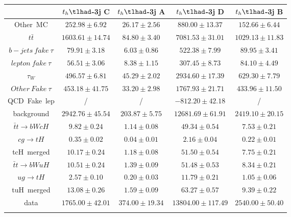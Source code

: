 \begin{tabular}{ccccc} \toprule\toprule
 & $t_{h}\tlhad$-3j C & $t_{h}\tlhad$-3j A & $t_{h}\tlhad$-3j D & $t_{h}\tlhad$-3j B\\\midrule
Other~MC & $252.98\pm6.92$ & $26.17\pm2.56$ & $880.00\pm13.37$ & $152.66\pm6.44$\\
$t\bar{t}$ & $1603.61\pm14.74$ & $84.80\pm3.40$ & $7081.53\pm31.01$ & $1029.13\pm11.83$\\
$b-jets~fake~\tau$ & $79.91\pm3.18$ & $6.03\pm0.86$ & $522.38\pm7.99$ & $89.95\pm3.41$\\
$lepton~fake~\tau$ & $56.51\pm3.06$ & $8.38\pm1.15$ & $307.45\pm8.73$ & $84.10\pm4.49$\\
$\tau_{W}$ & $496.57\pm6.81$ & $45.29\pm2.02$ & $2934.60\pm17.39$ & $629.30\pm7.79$\\
$Other~Fake~\tau$ & $453.18\pm41.75$ & $33.20\pm2.98$ & $1767.93\pm21.71$ & $433.96\pm11.50$\\
QCD~Fake~lep &  / &  / & $-812.20\pm42.18$ &  /\\
background & $2942.76\pm45.54$ & $203.87\pm5.75$ & $12681.69\pm61.91$ & $2419.10\pm20.15$\\\midrule
$\bar{t}t\to bWcH$ & $9.82\pm0.24$ & $1.14\pm0.08$ & $49.34\pm0.54$ & $7.53\pm0.21$\\
$cg\to tH$ & $0.35\pm0.02$ & $0.04\pm0.01$ & $2.16\pm0.04$ & $0.22\pm0.01$\\
tcH~merged & $10.17\pm0.24$ & $1.18\pm0.08$ & $51.50\pm0.54$ & $7.75\pm0.21$\\
$\bar{t}t\to bWuH$ & $10.51\pm0.24$ & $1.39\pm0.09$ & $51.48\pm0.53$ & $8.34\pm0.21$\\
$ug\to tH$ & $2.57\pm0.10$ & $0.20\pm0.03$ & $11.79\pm0.21$ & $1.05\pm0.06$\\
tuH~merged & $13.08\pm0.26$ & $1.59\pm0.09$ & $63.27\pm0.57$ & $9.39\pm0.22$\\\midrule
data & $1765.00\pm42.01$ & $374.00\pm19.34$ & $13804.00\pm117.49$ & $2540.00\pm50.40$\\
\bottomrule\bottomrule\\
\end{tabular}
